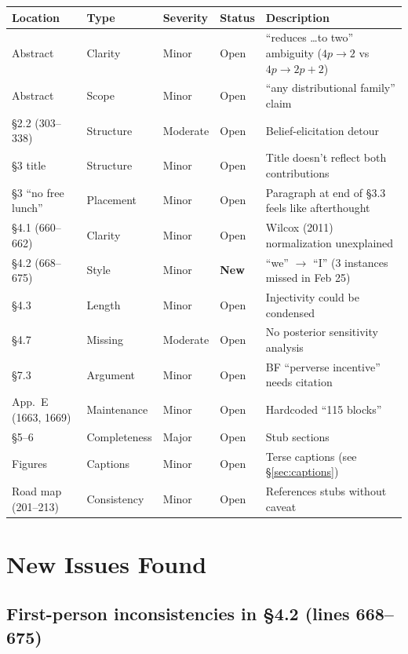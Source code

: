 \documentclass[12pt,a4paper]{article}
\begin{document}
\begin{center}
\begin{tabular}{lllll}
\toprule
Location & Type & Severity & Status & Description \\
\midrule
Abstract & Clarity & Minor & Open & ``reduces \ldots to two'' ambiguity ($4p \to 2$ vs $4p \to 2p+2$) \\
Abstract & Scope & Minor & Open & ``any distributional family'' claim \\
\S2.2 (303--338) & Structure & Moderate & Open & Belief-elicitation detour \\
\S3 title & Structure & Minor & Open & Title doesn't reflect both contributions \\
\S3 ``no free lunch'' & Placement & Minor & Open & Paragraph at end of \S3.3 feels like afterthought \\
\S4.1 (660--662) & Clarity & Minor & Open & Wilcox (2011) normalization unexplained \\
\S4.2 (668--675) & Style & Minor & \textbf{New} & ``we'' $\to$ ``I'' (3 instances missed in Feb 25) \\
\S4.3 & Length & Minor & Open & Injectivity could be condensed \\
\S4.7 & Missing & Moderate & Open & No posterior sensitivity analysis \\
\S7.3 & Argument & Minor & Open & BF ``perverse incentive'' needs citation \\
App.\ E (1663, 1669) & Maintenance & Minor & Open & Hardcoded ``115 blocks'' \\
\S5--6 & Completeness & Major & Open & Stub sections \\
Figures & Captions & Minor & Open & Terse captions (see \S\ref{sec:captions}) \\
Road map (201--213) & Consistency & Minor & Open & References stubs without caveat \\
\bottomrule
\end{tabular}
\end{center}


\section{New Issues Found}

\subsection{First-person inconsistencies in \S4.2 (lines 668--675)}
\end{document}
